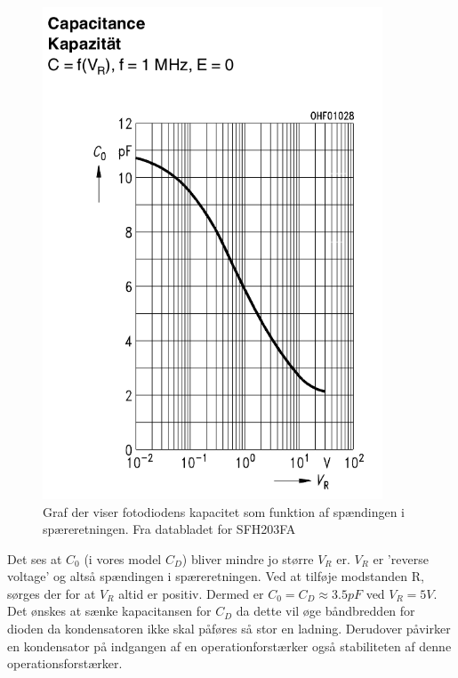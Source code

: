 \documentclass[HardwareDesign/HardwareDesign_main.tex]{subfiles}
\begin{document}
\begin{figure}[H]
    \centering
    \includegraphics[width=0.9\textwidth]{HardwareDesign/CupSensor/graphics/CapacitancePhotodiode.PNG}
    \caption{Graf der viser fotodiodens kapacitet som funktion af spændingen i spæreretningen. Fra databladet for SFH203FA\autocite[6]{SFH203FA}}
    \label{fig:CD-graph}
\end{figure}
Det ses at $C_0$ (i vores model $C_D$) bliver mindre jo større $V_R$ er. $V_R$ er 'reverse voltage' og altså spændingen i spæreretningen. Ved at tilføje modstanden R, sørges der for at $V_R$ altid er positiv. Dermed er $C_0 = C_D \approx 3.5\si{pF}$ ved $V_R=5\si{V}$. Det ønskes at sænke kapacitansen for $C_D$ da dette vil øge båndbredden for dioden da kondensatoren ikke skal påføres så stor en ladning. Derudover påvirker en kondensator på indgangen af en operationforstærker også stabiliteten af denne operationsforstærker.
\end{document}
